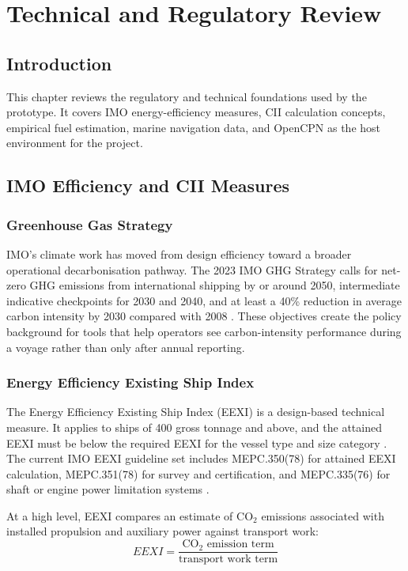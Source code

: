 \chapter{Technical and Regulatory Review}
\label{chap:literature-review}

\section{Introduction}
This chapter reviews the regulatory and technical foundations used by the prototype. It covers IMO energy-efficiency measures, CII calculation concepts, empirical fuel estimation, marine navigation data, and OpenCPN as the host environment for the project.

\section{IMO Efficiency and CII Measures}
\subsection{Greenhouse Gas Strategy}
IMO's climate work has moved from design efficiency toward a broader operational decarbonisation pathway. The 2023 IMO GHG Strategy calls for net-zero GHG emissions from international shipping by or around 2050, intermediate indicative checkpoints for 2030 and 2040, and at least a 40\% reduction in average carbon intensity by 2030 compared with 2008 \cite{imoGhgStrategy2026}. These objectives create the policy background for tools that help operators see carbon-intensity performance during a voyage rather than only after annual reporting.

\subsection{Energy Efficiency Existing Ship Index}
The Energy Efficiency Existing Ship Index (EEXI) is a design-based technical measure. It applies to ships of 400 gross tonnage and above, and the attained EEXI must be below the required EEXI for the vessel type and size category \cite{imoEexiCiiFaq2026}. The current IMO EEXI guideline set includes MEPC.350(78) for attained EEXI calculation, MEPC.351(78) for survey and certification, and MEPC.335(76) for shaft or engine power limitation systems \cite{imoEexiCiiFaq2026}.

At a high level, EEXI compares an estimate of CO$_2$ emissions associated with installed propulsion and auxiliary power against transport work:
\begin{equation}
    EEXI = \frac{\text{CO}_2 \text{ emission term}}{\text{transport work term}}
    \label{eq:eexi-basic}
\end{equation}

